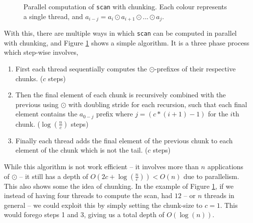 \documentclass[11pt]{article}
\begin{document}
\begin{figure}[h!]
  
  \caption{Parallel computation of \texttt{scan} with chunking. Each colour represents a single thread, and $a_{i-j} = a_i \odot a_{i+1} \odot ... \odot a_j$.}
  \label{fig:scancomp1}
\end{figure}
With this, there are multiple ways in which \texttt{scan} can be computed in parallel with chunking, and Figure \ref{fig:scancomp1} shows a simple algorithm.
 It is a three phase process which step-wise involves,
 \begin{enumerate}
 \item First each thread sequentially computes the $\odot$-prefixes of their respective chunks. ($c$ steps)
 \item Then the final element of each chunk is recursively combined with the previous using $\odot$ with
 doubling stride for each recursion, such that each final element contains the $a_{0-j}$ prefix where $j = (c * (i+1) - 1)$ for the
 $i$th chunk. ($\log(\frac{n}{c})$ steps)
 \item Finally each thread adds the final element of the previous chunk to each element of the chunk
 which is not the tail. ($c$ steps)
 \end{enumerate}
While this algorithm is not work efficient -- it involves more than $n$ applications of $\odot$ -- it still has a depth of $O(2c + \log(\frac{n}{c})) < O(n)$ due to parallelism.
 This also shows some the idea of chunking. In the example of Figure \ref{fig:scancomp1}, if we instead of having four threads to compute the scan, had $12$ -- or $n$ threads in general -- we
 could exploit this by simply setting the chunk-size to $c = 1$. This would forego steps 1 and 3, giving us a total depth of $O(\log(n))$.
\end{document}
